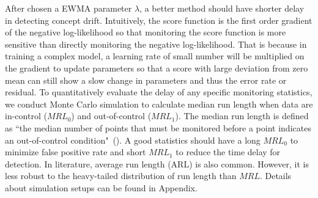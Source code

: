 \documentclass[twoside,11pt]{article}
\begin{document}
After chosen a EWMA parameter $\lambda$, a better method should have shorter delay in detecting concept drift. Intuitively, the score function is the first order gradient of the negative log-likelihood so that monitoring the score function is more sensitive than directly monitoring the negative log-likelihood. That is because in training a complex model, a learning rate of small number will be multiplied on the gradient to update parameters so that a score with large deviation from zero mean can still show a slow change in parameters and thus the error rate or residual. To quantitatively evaluate the delay of any specific monitoring statistics, we conduct Monte Carlo simulation to calculate median run length when data are in-control ($MRL_0$) and out-of-control ($MRL_1$). The median run length is defined as ``the median number of points that must be monitored before a point indicates an out-of-control condition"~(\cite{montgomery2007introduction}). A good statistics should have a long $MRL_0$ to minimize false positive rate and short $MRL_1$ to reduce the time delay for detection. In literature, average run length (ARL) is also common. However, it is less robust to the heavy-tailed distribution of run length than $MRL$. Details about simulation setups can be found in Appendix. 
\end{document}

